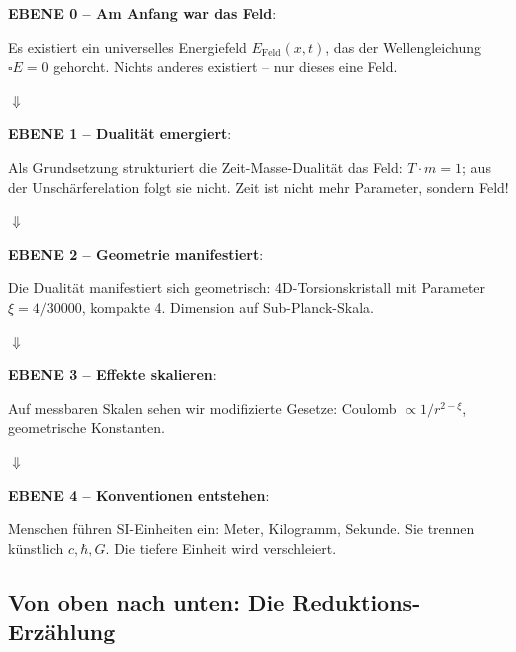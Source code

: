 \begin{revolutionary}
\textbf{EBENE 0 -- Am Anfang war das Feld}:

Es existiert ein universelles Energiefeld $E_{\text{Feld}}(x,t)$, das der Wellengleichung $\square E = 0$ gehorcht. Nichts anderes existiert -- nur dieses eine Feld.

\vspace{0.3cm}

$\Downarrow$

\vspace{0.3cm}

\textbf{EBENE 1 -- Dualität emergiert}:

Als Grundsetzung strukturiert die Zeit-Masse-Dualität das Feld: $T \cdot m = 1$; aus der Unschärferelation folgt sie nicht. Zeit ist nicht mehr Parameter, sondern Feld!

\vspace{0.3cm}

$\Downarrow$

\vspace{0.3cm}

\textbf{EBENE 2 -- Geometrie manifestiert}:

Die Dualität manifestiert sich geometrisch: 4D-Torsionskristall mit Parameter $\xi = 4/30000$, kompakte 4. Dimension auf Sub-Planck-Skala.

\vspace{0.3cm}

$\Downarrow$

\vspace{0.3cm}

\textbf{EBENE 3 -- Effekte skalieren}:

Auf messbaren Skalen sehen wir modifizierte Gesetze: Coulomb $\propto 1/r^{2-\xi}$, geometrische Konstanten.

\vspace{0.3cm}

$\Downarrow$

\vspace{0.3cm}

\textbf{EBENE 4 -- Konventionen entstehen}:

Menschen führen SI-Einheiten ein: Meter, Kilogramm, Sekunde. Sie trennen künstlich $c, \hbar, G$. Die tiefere Einheit wird verschleiert.
\end{revolutionary}

\subsection{Von oben nach unten: Die Reduktions-Erzählung}

